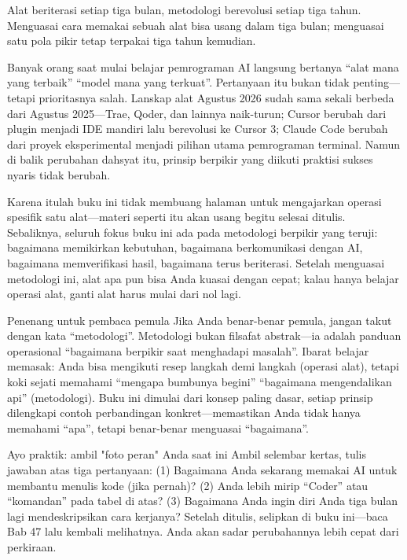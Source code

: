 
Alat beriterasi setiap tiga bulan, metodologi berevolusi setiap tiga tahun. Menguasai cara memakai sebuah alat bisa usang dalam tiga bulan; menguasai satu pola pikir tetap terpakai tiga tahun kemudian.

Banyak orang saat mulai belajar pemrograman AI langsung bertanya “alat mana yang terbaik” “model mana yang terkuat”. Pertanyaan itu bukan tidak penting—tetapi prioritasnya salah. Lanskap alat Agustus 2026 sudah sama sekali berbeda dari Agustus 2025—Trae, Qoder, dan lainnya naik-turun; Cursor berubah dari plugin menjadi IDE mandiri lalu berevolusi ke Cursor 3; Claude Code berubah dari proyek eksperimental menjadi pilihan utama pemrograman terminal. Namun di balik perubahan dahsyat itu, prinsip berpikir yang diikuti praktisi sukses nyaris tidak berubah.

Karena itulah buku ini tidak membuang halaman untuk mengajarkan operasi spesifik satu alat—materi seperti itu akan usang begitu selesai ditulis. Sebaliknya, seluruh fokus buku ini ada pada metodologi berpikir yang teruji: bagaimana memikirkan kebutuhan, bagaimana berkomunikasi dengan AI, bagaimana memverifikasi hasil, bagaimana terus beriterasi. Setelah menguasai metodologi ini, alat apa pun bisa Anda kuasai dengan cepat; kalau hanya belajar operasi alat, ganti alat harus mulai dari nol lagi.

\begin{tcbinfo}{Penenang untuk pembaca pemula}
Jika Anda benar-benar pemula, jangan takut dengan kata “metodologi”. Metodologi bukan filsafat abstrak—ia adalah panduan operasional “bagaimana berpikir saat menghadapi masalah”. Ibarat belajar memasak: Anda bisa mengikuti resep langkah demi langkah (operasi alat), tetapi koki sejati memahami “mengapa bumbunya begini” “bagaimana mengendalikan api” (metodologi). Buku ini dimulai dari konsep paling dasar, setiap prinsip dilengkapi contoh perbandingan konkret—memastikan Anda tidak hanya memahami “apa”, tetapi benar-benar menguasai “bagaimana”.

\end{tcbinfo}

\begin{tcbpractice}{Ayo praktik: ambil "foto peran" Anda saat ini}
Ambil selembar kertas, tulis jawaban atas tiga pertanyaan: (1) Bagaimana Anda sekarang memakai AI untuk membantu menulis kode (jika pernah)? (2) Anda lebih mirip “Coder” atau “komandan” pada tabel di atas? (3) Bagaimana Anda ingin diri Anda tiga bulan lagi mendeskripsikan cara kerjanya? Setelah ditulis, selipkan di buku ini—baca Bab 47 lalu kembali melihatnya. Anda akan sadar perubahannya lebih cepat dari perkiraan.

\end{tcbpractice}

